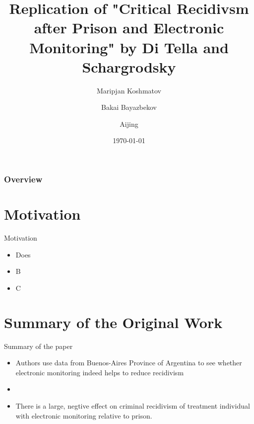 \documentclass{beamer}
\title[Short title]{Replication of "Critical Recidivsm after Prison and Electronic Monitoring" by Di Tella and Schargrodsky} %
\author{Maripjan Koshmatov \and Bakai Bayazbekov \and Aijing } %
\institute[LMU Munich] %
{
University of Munich \\ %
\medskip
}
\date{\today} %
\begin{document}
\begin{frame}
\titlepage %
\end{frame}

\begin{frame}
\frametitle{Overview} %
\tableofcontents %
\end{frame}



\section{Motivation}
\begin{frame}{Motivation}
    \begin{itemize}
        \item Does
        \item B
        \item C
    \end{itemize}
\end{frame}
\section{Summary of the Original Work}
\begin{frame}{Summary of the paper}
\begin{itemize}
        \item Authors use data from Buenos-Aires Province of Argentina to see whether electronic monitoring indeed helps to reduce recidivism
        \item 
        \item There is a large, negtive effect on criminal recidivism of treatment individual with electronic monitoring relative to prison.  

    \end{itemize}
\end{frame}
\end{document}
